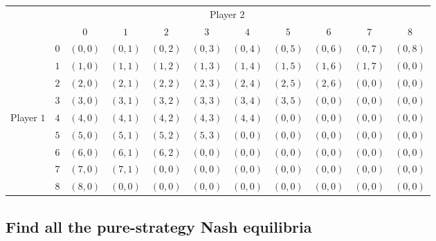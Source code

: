 \documentclass{article}
\begin{document}
\begin{table}[htbp]
\setlength{\extrarowheight}{2pt}
\begin{tabular}{cc|c|c|c|c|c|c|c|c|c|}
  & \multicolumn{3}{c}{} & \multicolumn{4}{c}{Player $2$} & \multicolumn{3}{c}{} \\
  & \multicolumn{1}{c}{} & \multicolumn{1}{c}{$0$} & \multicolumn{1}{c}{$1$} & \multicolumn{1}{c}{$2$} 
  & \multicolumn{1}{c}{$3$} & \multicolumn{1}{c}{$4$} & \multicolumn{1}{c}{$5$} & \multicolumn{1}{c}{$6$} 
  & \multicolumn{1}{c}{$7$} & \multicolumn{1}{c}{$8$}  \\\cline{3-11}
            & $0$ & $(0,0)$ & $(0,1)$ & $(0,2)$ & $(0,3)$ & $(0,4)$ & $(0,5)$ & $(0,6)$ & $(0,7)$ & $(0,8)$ \\ \cline{3-11}  
            & $1$ & $(1,0)$ & $(1,1)$ & $(1,2)$ & $(1,3)$ & $(1,4)$ & $(1,5)$ & $(1,6)$ & $(1,7)$ & $(0,0)$ \\ \cline{3-11}
  			& $2$ & $(2,0)$ & $(2,1)$ & $(2,2)$ & $(2,3)$ & $(2,4)$ & $(2,5)$ & $(2,6)$ & $(0,0)$ & $(0,0)$\\\cline{3-11}
            & $3$ & $(3,0)$ & $(3,1)$ & $(3,2)$ & $(3,3)$ & $(3,4)$ & $(3,5)$ & $(0,0)$ & $(0,0)$ & $(0,0)$ \\\cline{3-11}
Player $1$  & $4$ & $(4,0)$ & $(4,1)$ & $(4,2)$ & $(4,3)$ & $(4,4)$ & $(0,0)$ & $(0,0)$ & $(0,0)$ & $(0,0)$ \\\cline{3-11}
            & $5$ & $(5,0)$ & $(5,1)$ & $(5,2)$ & $(5,3)$ & $(0,0)$ & $(0,0)$ & $(0,0)$ & $(0,0)$ & $(0,0)$ \\\cline{3-11}
            & $6$ & $(6,0)$ & $(6,1)$ & $(6,2)$ & $(0,0)$ & $(0,0)$ & $(0,0)$ & $(0,0)$ & $(0,0)$ & $(0,0)$ \\\cline{3-11}
            & $7$ & $(7,0)$ & $(7,1)$ & $(0,0)$ & $(0,0)$ & $(0,0)$ & $(0,0)$ & $(0,0)$ & $(0,0)$ & $(0,0)$ \\\cline{3-11}
            & $8$ & $(8,0)$ & $(0,0)$ & $(0,0)$ & $(0,0)$ & $(0,0)$ & $(0,0)$ & $(0,0)$ & $(0,0)$ & $(0,0)$ \\\cline{3-11}

\end{tabular}
\end{table}



%
\subsection{Find all the pure-strategy Nash equilibria}
\end{document}
